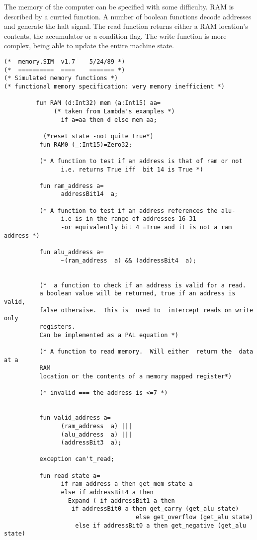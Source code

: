The memory of the computer can be specified with some difficulty.
RAM is described by a curried function.
A number of boolean functions decode addresses and generate the halt signal.
The read function returns either a RAM location's contents, the accumulator or
a condition flag.
The write function is more complex, being able to update the entire machine state.
\begin{verbatim}
(*	memory.SIM	v1.7 	5/24/89 *)
(*	==========	====	======= *)
(* Simulated memory functions *)         
(* functional memory specification: very memory inefficient *)

	     fun RAM (d:Int32) mem (a:Int15) aa= 
	          (* taken from Lambda's examples *)
                if a=aa then d else mem aa; 
                
           (*reset state -not quite true*)
          fun RAM0 (_:Int15)=Zero32; 
           
          (* A function to test if an address is that of ram or not 
                i.e. returns True iff  bit 14 is True *)

          fun ram_address a=
                addressBit14  a;

          (* A function to test if an address references the alu-
                i.e is in the range of addresses 16-31
                -or equivalently bit 4 =True and it is not a ram address *)

          fun alu_address a=
                ~(ram_address  a) && (addressBit4  a);


          (*  a function to check if an address is valid for a read.
          a boolean value will be returned, true if an address is valid,
          false otherwise.  This is  used to  intercept reads on write only
          registers.
          Can be implemented as a PAL equation *)

          (* A function to read memory.  Will either  return the  data at a
          RAM 
          location or the contents of a memory mapped register*)

          (* invalid === the address is <=7 *)


          fun valid_address a=
                (ram_address  a) |||
                (alu_address  a) |||
                (addressBit3  a);

          exception can't_read; 

          fun read state a= 
                if ram_address a then get_mem state a 
                else if addressBit4 a then 
                  Expand ( if addressBit1 a then 
                   if addressBit0 a then get_carry (get_alu state) 
                                     else get_overflow (get_alu state) 
                    else if addressBit0 a then get_negative (get_alu state)


\end{verbatim}
